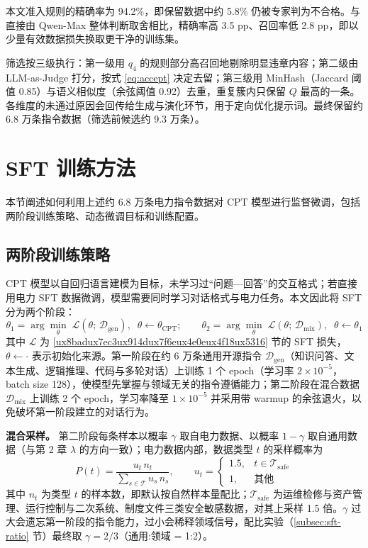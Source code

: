\documentclass[fontset=fandol,type=master,campus=shenzhen,etitleauto=true]{hithesisbook}
\begin{document}
本文准入规则的精确率为 94.2\%，即保留数据中约 5.8\% 仍被专家判为不合格。与直接由 Qwen-Max 整体判断取舍相比，精确率高 3.5 pp、召回率低 2.8 pp，即以少量有效数据损失换取更干净的训练集。

筛选按三级执行：第一级用 $q_4$ 的规则部分高召回地剔除明显违章内容；第二级由 LLM-as-Judge\cite{ref65} 打分，按式 \eqref{eq:accept} 决定去留；第三级用 MinHash（Jaccard 阈值 0.85）与语义相似度（余弦阈值 0.92）去重，重复簇内只保留 $Q$ 最高的一条。各维度的未通过原因会回传给生成与演化环节，用于定向优化提示词。最终保留约 6.8 万条指令数据（筛选前候选约 9.3 万条）。

\section{SFT 训练方法}\label{sec:sft-train}

本节阐述如何利用上述约 6.8 万条电力指令数据对 CPT 模型进行监督微调，包括两阶段训练策略、动态微调目标和训练配置。

\subsection{两阶段训练策略}\label{ux4e24ux9636ux6bb5-sft-ux7b56ux7565}

CPT 模型以自回归语言建模为目标，未学习过“问题—回答”的交互格式；若直接用电力 SFT 数据微调，模型需要同时学习对话格式与电力任务。本文因此将 SFT 分为两个阶段：
\begin{equation}\label{eq:sft-stage}
\theta_1 = \arg\min_{\theta} \; \mathcal{L}(\theta;\, \mathcal{D}_{\text{gen}}), \;\; \theta \leftarrow \theta_{\text{CPT}}; \qquad
\theta_2 = \arg\min_{\theta} \; \mathcal{L}(\theta;\, \mathcal{D}_{\text{mix}}), \;\; \theta \leftarrow \theta_1
\end{equation}
其中 $\mathcal{L}$ 为 \ref{ux8badux7ec3ux914dux7f6eux4e0eux4f18ux5316} 节的 SFT 损失，$\theta \leftarrow \cdot$ 表示初始化来源。第一阶段在约 6 万条通用开源指令 $\mathcal{D}_{\text{gen}}$（知识问答、文本生成、逻辑推理、代码与多轮对话）上训练 1 个 epoch（学习率 $2 \times 10^{-5}$，batch size 128），使模型先掌握与领域无关的指令遵循能力；第二阶段在混合数据 $\mathcal{D}_{\text{mix}}$ 上训练 2 个 epoch，学习率降至 $1 \times 10^{-5}$ 并采用带 warmup 的余弦退火，以免破坏第一阶段建立的对话行为。

\textbf{混合采样。} 第二阶段每条样本以概率 $\gamma$ 取自电力数据、以概率 $1 - \gamma$ 取自通用数据（与第 2 章 $\lambda$ 的方向一致）；电力数据内部，数据类型 $t$ 的采样概率为
\begin{equation}\label{eq:sft-sampling}
P(t) = \frac{u_t\, n_t}{\sum_{s \in \mathcal{T}} u_s\, n_s}, \qquad
u_t = \begin{cases} 1.5, & t \in \mathcal{T}_{\text{safe}} \\ 1, & \text{其他} \end{cases}
\end{equation}
其中 $n_t$ 为类型 $t$ 的样本数，即默认按自然样本量配比；$\mathcal{T}_{\text{safe}}$ 为运维检修与资产管理、运行控制与二次系统、制度文件三类安全敏感数据，对其上采样 1.5 倍。$\gamma$ 过大会遗忘第一阶段的指令能力，过小会稀释领域信号，配比实验（\ref{subsec:sft-ratio} 节）最终取 $\gamma = 2/3$（通用:领域 = 1:2）。
\end{document}
